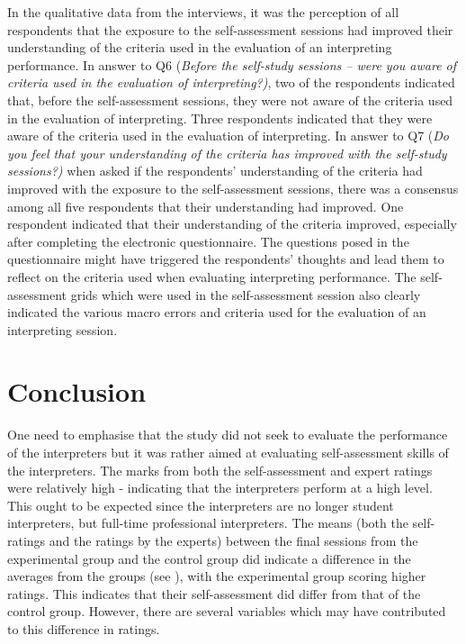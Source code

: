 \documentclass[output=paper]{langsci/langscibook}
\begin{document}
In the qualitative data from the interviews, it was the perception of all respondents that the exposure to the self-assessment sessions had improved their understanding of the criteria used in the evaluation of an interpreting performance. In answer to Q6 (\textit{Before the self-study sessions – were you aware of criteria used in the evaluation of interpreting?)}, two of the respondents indicated that, before the self-assessment sessions, they were not aware of the criteria used in the evaluation of interpreting. Three respondents indicated that they were aware of the criteria used in the evaluation of interpreting. In answer to Q7 (\textit{Do you feel that your understanding of the criteria has improved with the self-study sessions?)} when asked if the respondents’ understanding of the criteria had improved with the exposure to the self-assessment sessions, there was a consensus among all five respondents that their understanding had improved. One respondent indicated that their understanding of the criteria improved, especially after completing the electronic questionnaire. The questions posed in the questionnaire might have triggered the respondents’ thoughts and lead them to reflect on the criteria used when evaluating interpreting performance. The self-assessment grids which were used in the self-assessment session also clearly indicated the various macro errors and criteria used for the evaluation of an interpreting session. 

\section{Conclusion}

One need to emphasise that the study did not seek to evaluate the performance of the interpreters but it was rather aimed at evaluating self-assessment skills of the interpreters. The marks from both the self-assessment and expert ratings were relatively high -  indicating that the interpreters perform at a high level. This ought to be expected since the interpreters are no longer student interpreters, but full-time professional interpreters. The means (both the self-ratings and the ratings by the experts) between the final sessions from the experimental group and the control group did indicate a difference in the averages from the groups (see ), with the experimental group scoring higher ratings. This indicates that their self-assessment did differ from that of the control group. However, there are several variables which may have contributed to this difference in ratings.  
\end{document}
